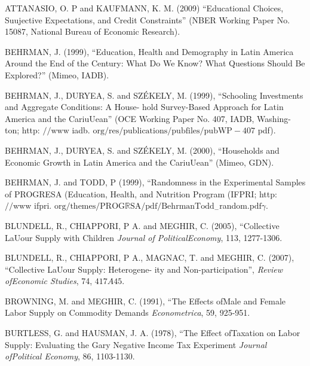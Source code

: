ATTANASIO, O. $\mathrm{P}$ and KAUFMANN, K. M. (2009) ``Educational Choices, Suujective Expectations, and Credit Constraints'' (NBER Working Paper No. 15087, National Bureau of Economic Research).

BEHRMAN, J. (1999), ``Education, Health and Demography in Latin America Around the End of the Century: What Do We Know? What Questions Should Be Explored?'' (Mimeo, IADB).

BEHRMAN, J., DURYEA, S. and SZ\'{E}KELY, M. (1999), ``Schooling Investments and Aggregate Conditions: A House- hold Survey-Based Approach for Latin America and the CariuUean'' (OCE Working Paper No. 407, IADB, Washing- ton; http: $//\mathrm{w}\mathrm{w}\mathrm{w}$ iadb. $\mathrm{o}\mathrm{r}\mathrm{g}/\mathrm{r}\mathrm{e}\mathrm{s}/\mathrm{p}\mathrm{u}\mathrm{b}\mathrm{l}\mathrm{i}\mathrm{c}\mathrm{a}\mathrm{t}\mathrm{i}\mathrm{o}\mathrm{n}\mathrm{s}/\mathrm{p}\mathrm{u}\mathrm{b}\mathrm{f}\mathrm{i}\mathrm{l}\mathrm{e}\mathrm{s}/\mathrm{p}\mathrm{u}\mathrm{b}\mathrm{W}\mathrm{P}-407$ pdf).

BEHRMAN, J., DURYEA, S. and SZ\'{E}KELY, M. (2000), ``Households and Economic Growth in Latin America and the CariuUean'' (Mimeo, GDN).

BEHRMAN, J. and TODD, $\mathrm{P}$ (1999), ``Randomness in the Experimental Samples of PROGRESA (Education, Health, and Nutrition Program (IFPRI; http: $//\mathrm{w}\mathrm{w}\mathrm{w}$ ifpri. $\mathrm{o}\mathrm{r}\mathrm{g}/\mathrm{t}\mathrm{h}\mathrm{e}\mathrm{m}\mathrm{e}\mathrm{s}/\mathrm{P}\mathrm{R}\mathrm{O}\mathrm{G}\mathbb{R}\mathrm{S}\mathrm{A}/\mathrm{p}\mathrm{d}\mathrm{f}/\mathrm{B}\mathrm{e}\mathrm{h}\mathrm{r}\mathrm{m}\mathrm{a}\mathrm{n}\mathrm{T}\mathrm{o}\mathrm{d}\mathrm{d}_{-}$random.$\mathrm{p}\mathrm{d}\mathrm{f}\gamma.$

BLUNDELL, R., CHIAPPORI, $\mathrm{P}$ A. and MEGHIR, C. (2005), ``Collective LaUour Supply with Children {\it Journal of PoliticalEconomy}, 113, 1277-1306.

BLUNDELL, R., CHIAPPORI, $\mathrm{P}$ A., MAGNAC, T. and MEGHIR, C. (2007), ``Collective LaUour Supply: Heterogene- ity and Non-participation'', {\it Review ofEconomic Studies}, 74, $417A45.$

BROWNING, M. and MEGHIR, C. (1991), ``The Effects ofMale and Female Labor Supply on Commodity Demands {\it Econometrica}, 59, 925-951.

BURTLESS, G. and HAUSMAN, J. A. (1978), ``The Effect ofTaxation on Labor Supply: Evaluating the Gary Negative Income Tax Experiment {\it Journal ofPolitical Economy}, 86, 1103-1130.

